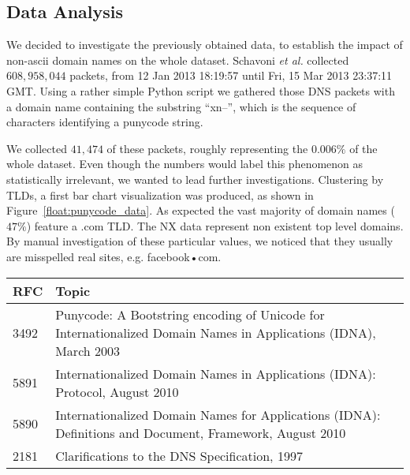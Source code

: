 \subsection{Data Analysis} %
\label{sub:data_analysis}

We decided to investigate the previously obtained data, to establish the impact of non-ascii
domain names on the whole dataset. Schavoni \emph{et al.} collected $608,958,044$ packets,
from 12 Jan 2013 18:19:57 until Fri, 15 Mar 2013 23:37:11 GMT. Using a rather simple Python
script we gathered those DNS packets with a domain name containing the substring ``xn--'', which
is the sequence of characters identifying a punycode string.

We collected $41,474$ of these packets, roughly representing the $0.006\%$ of the whole dataset.
Even though the numbers would label this phenomenon as statistically irrelevant, we wanted to
lead further investigations. Clustering by TLDs, a first bar chart visualization was
produced, as shown in Figure~\ref{float:punycode_data}. As expected the vast majority of domain
names ($47\%$) feature a .com TLD. The NX data represent non existent top level domains. By
manual investigation of these particular values, we noticed that they usually are misspelled
real sites, e.g. facebook•com.




\begin{table}[h!tp]
\centering
  \begin{tabular}{lp{14cm}}
    \toprule
    RFC & Topic \\
    \midrule
    3492 & Punycode: A Bootstring encoding of Unicode
       for Internationalized Domain Names in Applications (IDNA), March 2003 \\
    5891 & Internationalized Domain Names in Applications (IDNA): Protocol, August 2010 \\
    5890 & Internationalized Domain Names for Applications (IDNA): Definitions and Document, Framework, August 2010 \\
    2181 &  Clarifications to the DNS Specification, 1997 \\
    \bottomrule
  \end{tabular}
\end{table}




